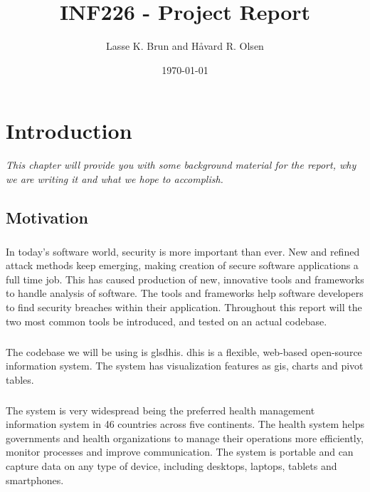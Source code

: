 \documentclass[11pt,english,a4paper]{report}
\title{INF226 - Project Report}
\date{\today}
\author{Lasse K. Brun and Håvard R. Olsen}
\begin{document}
\maketitle

\tableofcontents
\newpage

\printglossaries
\newpage


\chapter{Introduction}
\textit{This chapter will provide you with some background material for the report, why we are writing it and what we hope to accomplish.}

\section{Motivation}
\paragraph{}
In today's software world, security is more important than ever. New and refined attack methods keep emerging, making creation of secure software applications a full time job. This has caused production of new, innovative tools and frameworks to handle analysis of software. The tools and frameworks help software developers to find security breaches within their application. Throughout this report will the two most common tools be introduced, and tested on an actual codebase.

\paragraph{}
The codebase we will be using is gls{dhis}. \gls{dhis} is a flexible, web-based open-source information system. The system has visualization features as \gls{gis}, charts and pivot tables. 

\paragraph{}
The system is very widespread being the preferred health management information system in 46 countries across five continents. The health system helps governments and health organizations to manage their operations more efficiently, monitor processes and improve communication. The system is portable and can capture data on any type of device, including desktops, laptops, tablets and smartphones. 
\end{document}

